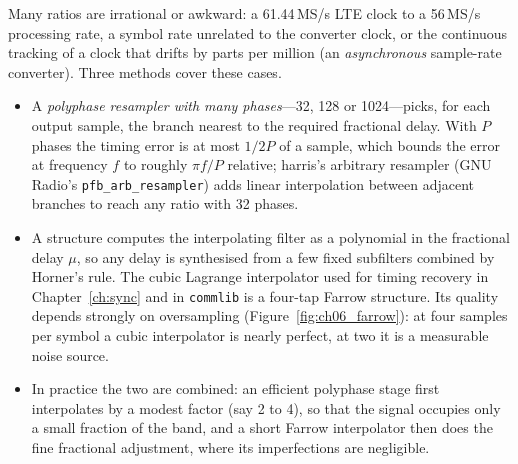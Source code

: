 Many ratios are irrational or awkward: a 61.44\,MS/s LTE clock to a 56\,MS/s processing rate, a
symbol rate unrelated to the converter clock, or the continuous tracking of a clock that drifts by
parts per million (an \emph{asynchronous} sample-rate converter). Three methods cover these cases.
\begin{itemize}
\item A \emph{polyphase resampler with many phases}---32, 128 or 1024---picks, for each output
sample, the branch nearest to the required fractional delay. With $P$ phases the timing error is at
most $1/2P$ of a sample, which bounds the error at frequency $f$ to roughly $\pi f/P$ relative;
harris's arbitrary resampler (GNU Radio's \texttt{pfb\_arb\_resampler}) adds linear interpolation
between adjacent branches to reach any ratio with 32 phases.
\item A  structure computes the interpolating filter as a polynomial in the
fractional delay $\mu$, so any delay is synthesised from a few fixed subfilters combined by Horner's
rule. The cubic Lagrange interpolator used for timing recovery in Chapter~\ref{ch:sync} and in
\texttt{commlib} is a four-tap Farrow structure. Its quality depends strongly on oversampling
(Figure~\ref{fig:ch06_farrow}): at four samples per symbol a cubic interpolator is nearly perfect,
at two it is a measurable noise source.
\item In practice the two are combined: an efficient polyphase stage first interpolates by a
modest factor (say 2 to 4), so that the signal occupies only a small fraction of the band, and a
short Farrow interpolator then does the fine fractional adjustment, where its imperfections are
negligible.
\end{itemize}


